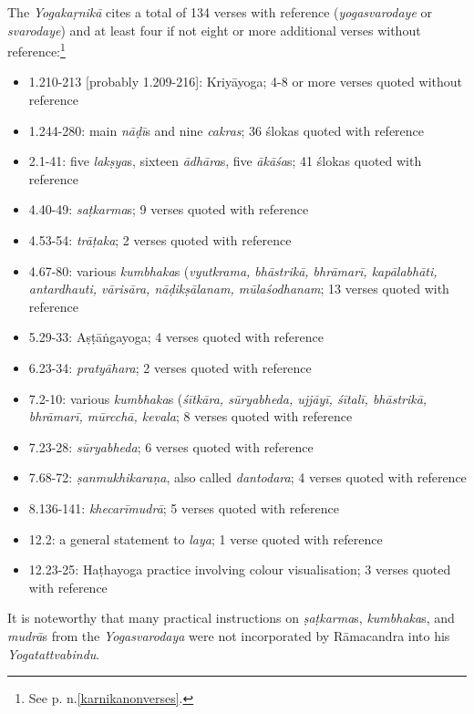 The \emph{Yogakaṛnikā} cites a total of 134 verses with reference (\textit{yogasvarodaye} or \textit{svarodaye}) and at least four if not eight or more additional verses without reference:\footnote{See p.\pageref{karnikanonverses} n.\ref{karnikanonverses}.}  
\begin{itemize}
  \item 1.210-213 [probably 1.209-216]: Kriyāyoga; 4-8 or more verses quoted without reference
  \item 1.244-280: main \textit{nāḍī}s and nine \textit{cakras}; 36 ślokas quoted with reference 
  \item 2.1-41: five \textit{lakṣya}s, sixteen \textit{ādhāra}s, five \textit{ākāśa}s; 41 ślokas quoted with reference 
  \item 4.40-49: \textit{saṭkarma}s; 9 verses quoted with reference 
  \item 4.53-54: \textit{trāṭaka}; 2 verses quoted with reference  
  \item 4.67-80: various \textit{kumbhaka}s (\textit{vyutkrama, bhāstrikā, bhrāmarī, kapālabhāti, antardhauti, vārisāra, nāḍikṣālanam, mūlaśodhanam}; 13 verses quoted with reference
  \item 5.29-33: Aṣṭāṅgayoga; 4 verses quoted with reference 
  \item 6.23-34: \textit{pratyāhara}; 2 verses quoted with reference
  \item 7.2-10: various \textit{kumbhaka}s (\textit{śītkāra, sūryabheda, ujjāyī, śītalī, bhāstrikā, bhrāmarī, mūrcchā, kevala}; 8 verses quoted with reference 
  \item 7.23-28: \textit{sūryabheda}; 6 verses quoted with reference
  \item 7.68-72: \textit{ṣanmukhikaraṇa}, also called \textit{dantodara}; 4 verses quoted with reference 
  \item 8.136-141: \textit{khecarīmudrā}; 5 verses quoted with reference
  \item 12.2: a general statement to \textit{laya}; 1 verse quoted with reference 
  \item 12.23-25: Haṭhayoga practice involving colour visualisation; 3 verses quoted with reference
\end{itemize}
  
  It is noteworthy that many practical instructions on \textit{ṣaṭkarma}s, \textit{kumbhaka}s, and \textit{mudrā}s from the \emph{Yogasvarodaya} were not incorporated by Rāmacandra into his \emph{Yogatattvabindu}.

